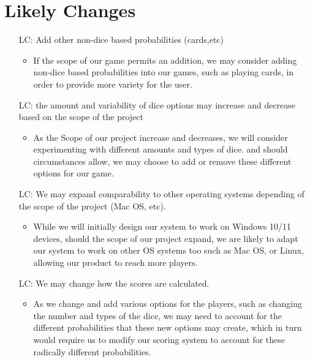 \section{Likely Changes}    

\noindent \begin{itemize}

\item[LC\refstepcounter{lcnum}\thelcnum\label{LC_meaningfulLabel}:] Add other non-dice based probabilities (cards,etc)

\begin{itemize}
	\item If the scope of our game permits an addition, we may consider adding non-dice based probabilities into our games, such as playing cards, in order to provide more variety for the user.
\end{itemize}

\item[LC\refstepcounter{lcnum}\thelcnum\label{LC_meaningfulLabel}:] the amount and variability of dice options may increase and decrease based on the scope of the project

\begin{itemize}
	\item As the Scope of our project increase and decreases, we will consider experimenting with different amounts and types of dice. and should circumstances allow, we may choose to add or remove these different options for our game.
\end{itemize}

\item[LC\refstepcounter{lcnum}\thelcnum\label{LC_meaningfulLabel}:] We may expand comparability to other operating systems depending of the scope of the project (Mac OS, etc).

\begin{itemize}
	\item While we will initially design our system to work on Windows 10/11 devices, should the scope of our project expand, we are likely to adapt our system to work on other OS systems too such as Mac OS, or Linux, allowing our product to reach more players.
\end{itemize}

\item[LC\refstepcounter{lcnum}\thelcnum\label{LC_meaningfulLabel}:] We may change how the scores are calculated.

\begin{itemize}
	\item As we change and add various options for the players, such as changing the number and types of the dice, we may need to account for the different probabilities that these new options may create, which in turn would require us to modify our scoring system to account for these radically different probabilities.
\end{itemize}


\end{itemize}
